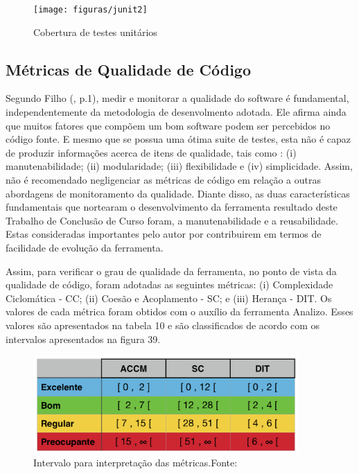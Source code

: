\begin{figure}[h!]
\centering
\label{f22}
\texttt{[image: figuras/junit2]}
\caption{Cobertura de testes unitários}

\end{figure}
\FloatBarrier


\subsection{Métricas de Qualidade de Código}

Segundo Filho (\citeyear{filho2013}, p.1), medir e monitorar a qualidade do software é fundamental, independentemente da metodologia de desenvolmento adotada. Ele afirma ainda que muitos fatores que compõem um bom software podem ser percebidos no código fonte. E mesmo que se possua uma ótima suite de testes, esta não é capaz de produzir informações acerca de itens de qualidade, tais como : (i) manutenabilidade; (ii) modularidade; (iii) flexibilidade e (iv) simplicidade. Assim, não é recomendado negligenciar as métricas de código em relação a outras abordagens de monitoramento da qualidade. Diante disso, as duas características fundamentais que nortearam o desenvolvimento da ferramenta resultado deste Trabalho de Conclusão de Curso foram, a manutenabilidade e a reusabilidade. Estas consideradas importantes pelo autor por contribuirem em termos de facilidade de evolução da ferramenta. 

Assim, para verificar o grau de qualidade da ferramenta, no ponto de vista da qualidade de código, foram adotadas as seguintes métricas: (i) Complexidade Ciclomática - CC; (ii)  Coesão e Acoplamento  - SC; e (iii) Herança - DIT. Os valores de cada métrica foram obtidos com o auxílio da ferramenta Analizo. Esses valores são apresentados na tabela 10 e são classificados de acordo com os intervalos apresentados na figura 39.

\begin{figure}[h!]
\centering
\label{f25}
\includegraphics[width=0.9\textwidth]{figuras/metricas}
\caption{Intervalo para interpretação das métricas.\newline Fonte:\cite{filho2013}}
\end{figure}

